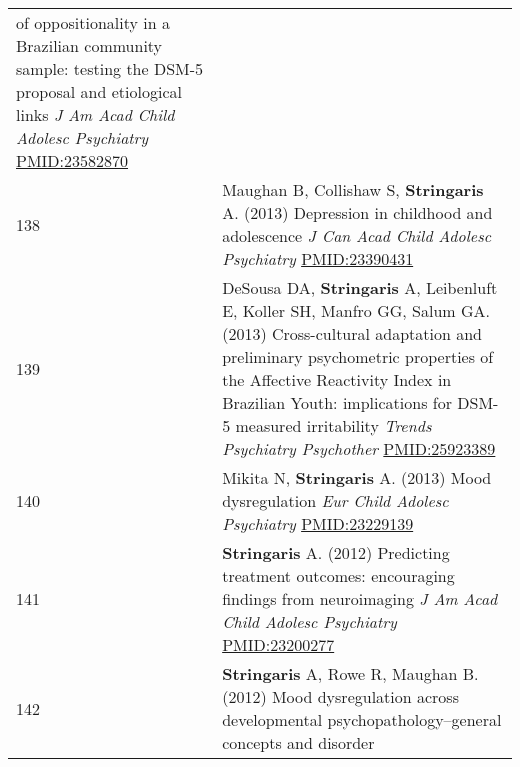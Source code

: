 \documentclass[
]{article}
\begin{document}
\begin{longtable}[]{@{}ll@{}}
\begin{minipage}[t]{0.94\columnwidth}
of oppositionality in a Brazilian community sample: testing the DSM-5
proposal and etiological links \emph{J Am Acad Child Adolesc Psychiatry}
\url{PMID:23582870}\strut
\end{minipage}\tabularnewline
\begin{minipage}[t]{0.01\columnwidth}\raggedright
138\strut
\end{minipage} & \begin{minipage}[t]{0.94\columnwidth}\raggedright
Maughan B, Collishaw S, \textbf{Stringaris} A. (2013) Depression in
childhood and adolescence \emph{J Can Acad Child Adolesc Psychiatry}
\url{PMID:23390431}\strut
\end{minipage}\tabularnewline
\begin{minipage}[t]{0.01\columnwidth}\raggedright
139\strut
\end{minipage} & \begin{minipage}[t]{0.94\columnwidth}\raggedright
DeSousa DA, \textbf{Stringaris} A, Leibenluft E, Koller SH, Manfro GG,
Salum GA. (2013) Cross-cultural adaptation and preliminary psychometric
properties of the Affective Reactivity Index in Brazilian Youth:
implications for DSM-5 measured irritability \emph{Trends Psychiatry
Psychother} \url{PMID:25923389}\strut
\end{minipage}\tabularnewline
\begin{minipage}[t]{0.01\columnwidth}\raggedright
140\strut
\end{minipage} & \begin{minipage}[t]{0.94\columnwidth}\raggedright
Mikita N, \textbf{Stringaris} A. (2013) Mood dysregulation \emph{Eur
Child Adolesc Psychiatry} \url{PMID:23229139}\strut
\end{minipage}\tabularnewline
\begin{minipage}[t]{0.01\columnwidth}\raggedright
141\strut
\end{minipage} & \begin{minipage}[t]{0.94\columnwidth}\raggedright
\textbf{Stringaris} A. (2012) Predicting treatment outcomes: encouraging
findings from neuroimaging \emph{J Am Acad Child Adolesc Psychiatry}
\url{PMID:23200277}\strut
\end{minipage}\tabularnewline
\begin{minipage}[t]{0.01\columnwidth}\raggedright
142\strut
\end{minipage} & \begin{minipage}[t]{0.94\columnwidth}\raggedright
\textbf{Stringaris} A, Rowe R, Maughan B. (2012) Mood dysregulation
across developmental psychopathology--general concepts and disorder

\end{minipage}
\end{longtable}
\end{document}
